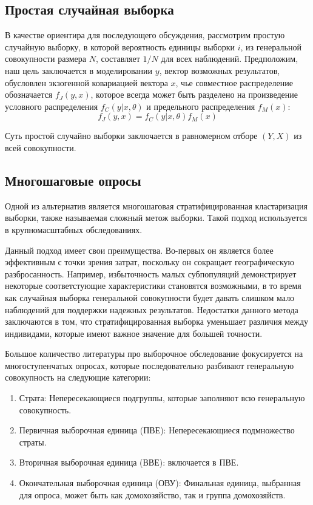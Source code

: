 \subsection{Простая случайная выборка}

В качестве ориентира для последующего обсуждения, рассмотрим простую случайную выборку, в которой вероятность единицы выборки $i$, из генеральной совокупности размера $N$, составляет $1/N$ для всех наблюдений. Предположим, наш цель заключается в моделировании $y$, вектор возможных результатов, обусловлен экзогенной ковариацией вектора $x$, чье совместное распределение обозначается $f_{J}(y,x)$, которое всегда может быть разделено на произведение условного распределения $f_{C}(y|x,\theta)$ и предельного распределения $f_{M}(x)$:
\begin{equation}
f_{J}(y,x)=f_{C}(y|x,\theta)f_{M}(x)
\end{equation}

Суть простой случайно выборки заключается в равномерном отборе $(Y,X)$ из всей совокупности.


\subsection{Многошаговые опросы}

Одной из альтернатив является многошаговая стратифицированная кластаризация выборки, также называемая сложный метож выборки. Такой подход используется в крупномасштабных обследованиях. 
	
	
Данный подход имеет свои преимущества. Во-первых он является более эффективным с точки зрения затрат, поскольку он сокращает географическую разбросанность. Например, избыточность малых субпопуляций демонстрирует некоторые соответстующие характеристики становятся возможными, в то время как случайная выборка генеральной совокупности будет давать слишком мало наблюдений для поддержки надежных результатов. Недостатки данного метода заключаются в том, что стратифицированная выборка уменьшает различия между индивидами, которые имеют важное значение для большей точности.


Большое количество литературы про выборочное обследование  фокусируется на многоступенчатых опросах, которые последовательно разбивают генеральную совокупность на следующие категории:

\begin{enumerate}
\item Страта: Непересекающиеся подгруппы, которые заполняют всю генеральную совокупность.
\item Первичная выборочная единица (ПВЕ): Непересекающиеся подмножество страты.
\item Вторичная выборочная единица (ВВЕ): включается в ПВЕ.
\item Окончательная выборочная единица (ОВУ): Финальная единица, выбранная для опроса, может быть как домохозяйство, так и группа домохозяйств.
\end{enumerate}


